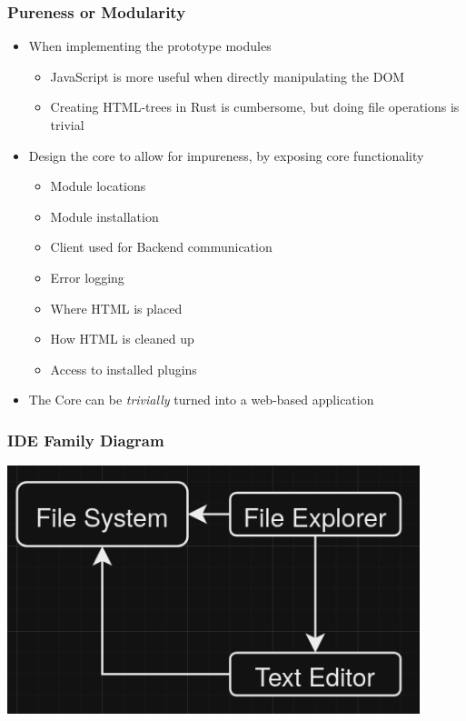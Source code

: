 \documentclass{beamer}
\begin{document}
\begin{frame}
  \frametitle{Pureness or Modularity}
  \begin{itemize}
    \item When implementing the prototype modules
      \begin{itemize}
        \item JavaScript is more useful when directly manipulating the DOM
        \item Creating HTML-trees in Rust is cumbersome, but doing file
          operations is trivial
      \end{itemize}
    \item Design the core to allow for impureness, by exposing core
      functionality
      \begin{itemize}
        \item Module locations
        \item Module installation
        \item Client used for Backend communication
        \item Error logging
        \item Where HTML is placed
        \item How HTML is cleaned up
        \item Access to installed plugins
      \end{itemize}
    \item The Core can be \textit{trivially} turned into a web-based application
  \end{itemize}
\end{frame}

\begin{frame}
  \frametitle{IDE Family Diagram}
    \centering
    \includegraphics[width=0.9\textwidth]{../../pics/ide-family.png}
\end{frame}
\end{document}

